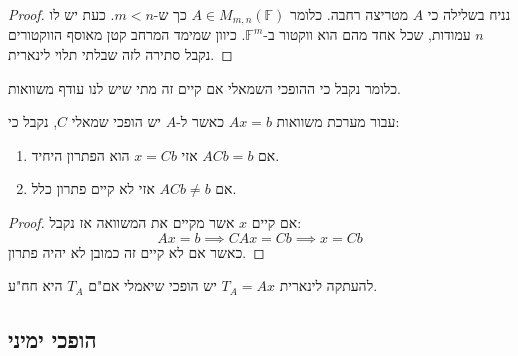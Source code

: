 \documentclass{tstextbook}
\begin{document}
\begin{proof}
נניח בשלילה כי \(A\) מטריצה רחבה. כלומר \(A \in M_{m,n}\left( \mathbb{F}  \right)\) כך ש-\(m<n\). כעת יש לו \(n\) עמודות, שכל אחד מהם הוא ווקטור ב-\(\mathbb{F} ^{m}\). כיוון שמימד המרחב קטן מאוסף הווקטורים נקבל סתירה לזה שבלתי תלוי לינארית.

\end{proof}
\begin{corollary}
כלומר נקבל כי ההופכי השמאלי אם קיים זה מתי שיש לנו עודף משוואות. 

\end{corollary}
\begin{proposition}
עבור מערכת משוואות \(Ax=b\) כאשר ל-\(A\) יש הופכי שמאלי \(C\), נקבל כי:

  \begin{enumerate}
    \item אם \(ACb=b\) אזי \(x=Cb\) הוא הפתרון היחיד. 


    \item אם \(ACb\neq b\) אזי לא קיים פתרון כלל. 


  \end{enumerate}
\end{proposition}
\begin{proof}
אם קיים \(x\) אשר מקיים את המשוואה אז נקבל:
$$Ax=b\implies CAx=Cb\implies x=Cb$$
כאשר אם לא קיים זה כמובן לא יהיה פתרון.

\end{proof}
\begin{proposition}
להעתקה לינארית \(T_{A}=Ax\) יש הופכי שיאמלי אם"ם \(T_{A}\) היא חח"ע.

\end{proposition}
\subsection{הופכי ימיני}
\end{document}
